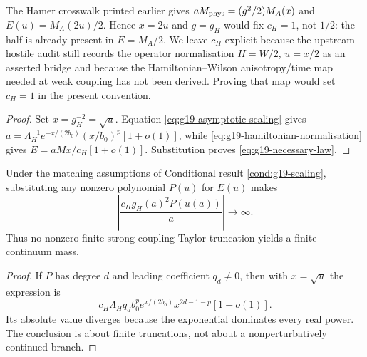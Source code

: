The Hamer crosswalk printed earlier gives
$aM_{\rm phys}=(g^2/2)M_A(x)$ and
$E(u)=M_A(2u)/2$.  Hence $x=2u$ and $g=g_H$ would fix $c_H=1$,
not $1/2$: the half is already present in $E=M_A/2$.  We leave $c_H$
explicit because the upstream hostile audit still records the operator
normalisation $H=W/2$, $u=x/2$ as an asserted bridge and because the
Hamiltonian--Wilson anisotropy/time map needed at weak coupling has not been
derived.  Proving that map would set $c_H=1$ in the present convention.

\begin{proof}
Set $x=g_H^{-2}=\sqrt u$.  Equation
\eqref{eq:g19-asymptotic-scaling} gives
$a=\Lambda_H^{-1}e^{-x/(2b_0)}(x/b_0)^p[1+o(1)]$, while
\eqref{eq:g19-hamiltonian-normalisation} gives
$E=aMx/c_H[1+o(1)]$.  Substitution proves
\eqref{eq:g19-necessary-law}.
\end{proof}

\begin{corollary}
\label{cor:g19-polynomial-obstruction}
Under the matching assumptions of Conditional result
\ref{cond:g19-scaling}, substituting any nonzero polynomial $P(u)$ for
$E(u)$ makes
\[
 \left|\frac{c_Hg_H(a)^2P(u(a))}{a}\right|\longrightarrow\infty.
\]
Thus no nonzero finite strong-coupling Taylor truncation yields a finite
continuum mass.
\end{corollary}

\begin{proof}
If $P$ has degree $d$ and leading coefficient $q_d\ne0$, then with
$x=\sqrt u$ the expression is
\[
 c_H\Lambda_Hq_db_0^p
 e^{x/(2b_0)}x^{2d-1-p}[1+o(1)].
\]
Its absolute value diverges because the exponential dominates every real
power.  The conclusion is about finite truncations, not about a
nonperturbatively continued branch.
\end{proof}

